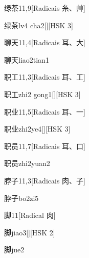 \begin{entry}{绿茶}{11,9}[Radicais ⽷、⾋]
  \begin{phonetics}{绿茶}{lv4 cha2}[][HSK 3]
  \end{phonetics}
\end{entry}

\begin{entry}{聊天}{11,4}[Radicais ⽿、⼤]
  \begin{phonetics}{聊天}{liao2tian1}
  \end{phonetics}
\end{entry}

\begin{entry}{职工}{11,3}[Radicais ⽿、⼯]
  \begin{phonetics}{职工}{zhi2 gong1}[][HSK 3]
  \end{phonetics}
\end{entry}

\begin{entry}{职业}{11,5}[Radicais ⽿、⼀]
  \begin{phonetics}{职业}{zhi2ye4}[][HSK 3]
  \end{phonetics}
\end{entry}

\begin{entry}{职员}{11,7}[Radicais ⽿、⼝]
  \begin{phonetics}{职员}{zhi2yuan2}
  \end{phonetics}
\end{entry}

\begin{entry}{脖子}{11,3}[Radicais ⾁、⼦]
  \begin{phonetics}{脖子}{bo2zi5}
  \end{phonetics}
\end{entry}

\begin{entry}{脚}{11}[Radical ⾁]
  \begin{phonetics}{脚}{jiao3}[][HSK 2]
  \end{phonetics}
  \begin{phonetics}{脚}{jue2}
  \end{phonetics}
\end{entry}

